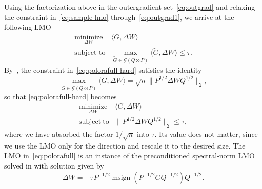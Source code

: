 \documentclass[11pt]{article}
\newcommand{\ip}[1]{\langle #1 \rangle}
\DeclareMathOperator{\msign}{msign}
\theoremstyle{plain}
\theoremstyle{definition}
\theoremstyle{remark}
\theoremstyle{definition}
\begin{document}
Using the factorization above in the outergradient set~\eqref{eq:outgrad} and relaxing the constraint in~\eqref{eq:sample-lmo} through~\eqref{eq:outgrad1}, we arrive at the following LMO
\begin{equation}
 \begin{array}{ll}
  \underset{\Delta W}{\mathrm{minimize}} &
  \ip{G, \Delta W} \\[2pt]
\mbox{subject to} &
  \displaystyle  
\max_{\widetilde{G} \in \mathcal{G}(Q \otimes P)} \ip{\widetilde{G}, \Delta W} 
  \le \tau.
  \end{array}
  \label{eq:polorafull-hard} 
\end{equation}
By~, the constraint in~\eqref{eq:polorafull-hard} satisfies the identity
\[
\max_{\widetilde{G} \in \mathcal{G}(Q \otimes P)}\ip{\widetilde{G}, \Delta W}
= \sqrt{n} \| P^{1/2} \Delta W Q^{1/2}\|_2,
\]
so that \eqref{eq:polorafull-hard} becomes
\begin{equation}
\begin{array}{ll}
\underset{\Delta W}{\mathrm{minimize}} &
\ip{G, \Delta W} \\[2pt]
\mathrm{subject~ to} &
\displaystyle  
\|P^{1/2} \Delta W Q^{1/2}\|_2 \leq  \tau,
\end{array}
\label{eq:polorafull}
\end{equation}
where we have absorbed the factor $1 / \sqrt{n}$ into $\tau$. Its value does not matter, since we use the LMO only for the direction and rescale it to the desired size. The LMO in~\eqref{eq:polorafull} is an instance of the preconditioned spectral-norm LMO solved in  with solution given by
\begin{equation}\label{eq:polorafull-update}
    \Delta W =  - \tau P^{-1/2} \msign(P^{-1/2} G Q^{-1/2}) Q^{-1/2}.
\end{equation} 
\end{document}
